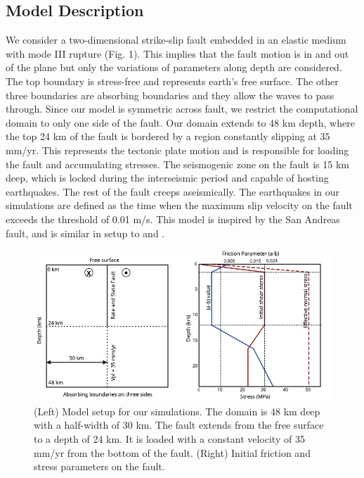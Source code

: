 \documentclass[11pt]{article}
\newcommand{\yihe}[1]{{\color{red}#1}}
\begin{document}
\subsection{Model Description}
We consider a two-dimensional strike-slip fault embedded in an elastic medium with mode III rupture (Fig. 1). This implies that the fault motion is in and out of the plane but only the variations of parameters along depth are considered. The top boundary is stress-free and represents earth’s free surface. The other three boundaries are absorbing boundaries and they allow the waves to pass through. Since our model is symmetric across fault, we restrict the computational domain to only one side of the fault. Our domain extends to 48 km depth, where the top 24 km of the fault is bordered by a region constantly slipping at 35 mm/yr. This represents the tectonic plate motion and is responsible for loading the fault and accumulating stresses. The seismogenic zone on the fault is 15 km deep, which is locked during the interseismic period and capable of hosting earthquakes. The rest of the fault creeps aseismically. \yihe{The earthquakes in our simulations are defined as the time when the maximum slip velocity on the fault exceeds the threshold of 0.01 m/s.} This model is inspired by the San Andreas fault, and is similar in setup to \citet{lapusta_2000} and \citet{kaneko_2011}.

\begin{figure}[!htb]
    \centering
    \label{fig1}
    \includegraphics[scale=1]{1.png}
    \caption{(Left) Model setup for our simulations. The domain is 48 km deep with a half-width of 30 km. The fault extends from the free surface to a depth of 24 km. It is loaded with a constant velocity of 35 mm/yr from the bottom of the fault. (Right) Initial friction and stress parameters on the fault. }
\end{figure}
\end{document}
